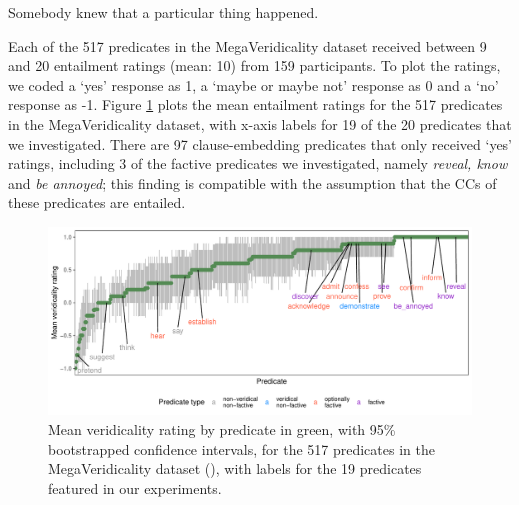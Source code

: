 \documentclass[11pt,fleqn]{article}
\newcommand{\6}{\mbox{$[\hspace*{-.6mm}[$}}
\newcommand{\9}{\mbox{$]\hspace*{-.6mm}]$}}
\begin{document}
{\begin{exe}
\ex\label{wr-stim-ent} Somebody knew that a particular thing happened.
\end{exe}

Each of the 517 predicates in the MegaVeridicality dataset received between 9 and 20 entailment ratings (mean: 10) from 159 participants. To plot the ratings, we coded a `yes' response as 1, a `maybe or maybe not' response as 0 and a `no' response as -1. Figure \ref{f-white-rawlins-ent} plots the mean entailment ratings for the 517 predicates in the MegaVeridicality dataset, with x-axis labels for 19 of the 20 predicates that we investigated. There are 97 clause-embedding predicates that only received `yes' ratings, including 3 of the factive predicates we investigated, namely {\em reveal, know} and {\em be annoyed}; this finding is compatible with the assumption that the CCs of these predicates are entailed. 

\begin{figure}[H]
\centering
\includegraphics[width=.75\paperwidth]{../../MegaVeridicality-analysis/graphs/means-entailment-by-predicate}

\caption{Mean veridicality rating by predicate in green, with 95\% bootstrapped confidence intervals, for the 517 predicates in the MegaVeridicality dataset (\citealt{white-rawlins-nels2018,white-etal2018b}), with labels for the 19 predicates featured in our experiments.}
\label{f-white-rawlins-ent}
\end{figure}

}
\end{document}
